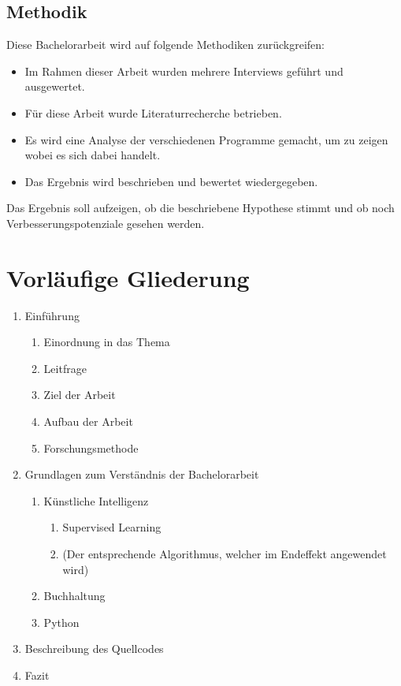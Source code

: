 \documentclass[hidelinks,12pt,a4paper]{article}
\begin{document}
\subsection{Methodik}
Diese Bachelorarbeit wird auf folgende Methodiken zurückgreifen:

\begin{itemize}
	\item Im Rahmen dieser Arbeit wurden mehrere Interviews geführt und ausgewertet.
	\item Für diese Arbeit wurde Literaturrecherche betrieben. 
	\item Es wird eine Analyse der verschiedenen Programme gemacht, um zu zeigen wobei es sich dabei handelt. 
	\item Das Ergebnis wird beschrieben und bewertet wiedergegeben.
\end{itemize}

Das Ergebnis soll aufzeigen, ob die beschriebene Hypothese stimmt und ob noch Verbesserungspotenziale gesehen werden. 

\newpage
\section{Vorläufige Gliederung}
\begin{enumerate}
	\item Einführung
	\begin{enumerate}
		\item Einordnung in das Thema 
		\item Leitfrage
		\item Ziel der Arbeit 
		\item Aufbau der Arbeit
		\item Forschungsmethode 
	\end{enumerate}


	\item Grundlagen zum Verständnis der Bachelorarbeit 
	\begin{enumerate}
		\item Künstliche Intelligenz
		\begin{enumerate}
			\item Supervised Learning 
			\item (Der entsprechende Algorithmus, welcher im Endeffekt angewendet wird)
		\end{enumerate}
		\item Buchhaltung 
		\item Python
	\end{enumerate}
	
	\item Beschreibung des Quellcodes 
	\item Fazit
\end{enumerate}
\end{document}
